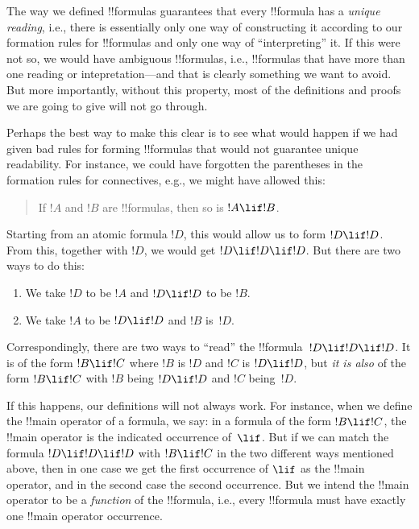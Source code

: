 \documentclass[../../../include/open-logic-section]{subfiles}
\begin{document}


\begin{explain}
The way we defined !!{formula}s guarantees that every !!{formula} has
a \emph{unique reading}, i.e., there is essentially only one way of
constructing it according to our formation rules for !!{formula}s and
only one way of ``interpreting'' it.  If this were not so, we would
have ambiguous !!{formula}s, i.e., !!{formula}s that have more than
one reading or intepretation---and that is clearly something we want
to avoid.  But more importantly, without this property, most of the
definitions and proofs we are going to give will not go through.

Perhaps the best way to make this clear is to see what would happen if
we had given bad rules for forming !!{formula}s that would not
guarantee unique readability.  For instance, we could have forgotten
the parentheses in the formation rules for connectives, e.g., we might
have allowed this:
\begin{quote}
If $!A$ and $!B$ are !!{formula}s, then so is $!A \lif !B$.
\end{quote}
Starting from an atomic formula $!D$, this would allow us to form $!D
\lif !D$. From this, together with $!D$, we would get $!D \lif !D
\lif !D$.  But there are two ways to do this:
\begin{enumerate}
\item We take $!D$ to be $!A$ and $!D \lif !D$ to be $!B$.
\item We take $!A$ to be $!D \lif !D$ and $!B$ is~$!D$.  
\end{enumerate}
Correspondingly, there are two ways to
``read'' the !!{formula}~$!D \lif !D \lif !D$. It is of the form $!B
\lif !C$ where $!B$ is $!D$ and $!C$ is $!D \lif !D$, but \emph{it is
  also} of the form $!B \lif !C$ with $!B$ being $!D \lif !D$ and $!C$
being~$!D$.

If this happens, our definitions will not always work. For instance,
when we define the !!{main operator} of a formula, we say: in a
formula of the form $!B \lif !C$, the !!{main operator} is the
indicated occurrence of~$\lif$. But if we can match the formula $!D
\lif !D \lif !D$ with $!B \lif !C$ in the two different ways mentioned
above, then in one case we get the first occurrence of $\lif$ as the
!!{main operator}, and in the second case the second occurrence.  But
we intend the !!{main operator} to be a \emph{function} of the
!!{formula}, i.e., every !!{formula} must have exactly one !!{main
  operator} occurrence.
\end{explain}
\end{document}
